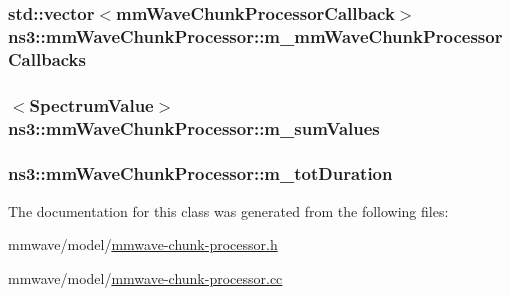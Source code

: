\subsubsection[{\texorpdfstring{m\+\_\+mm\+Wave\+Chunk\+Processor\+Callbacks}{m_mmWaveChunkProcessorCallbacks}}]{\setlength{\rightskip}{0pt plus 5cm}std\+::vector$<${\bf mm\+Wave\+Chunk\+Processor\+Callback}$>$ ns3\+::mm\+Wave\+Chunk\+Processor\+::m\+\_\+mm\+Wave\+Chunk\+Processor\+Callbacks\hspace{0.3cm}{\ttfamily [private]}}\hypertarget{classns3_1_1mmWaveChunkProcessor_a21edc5971d3aad6b36fb74f6802bb144}{}\label{classns3_1_1mmWaveChunkProcessor_a21edc5971d3aad6b36fb74f6802bb144}
\subsubsection[{\texorpdfstring{m\+\_\+sum\+Values}{m_sumValues}}]{$<${\bf Spectrum\+Value}$>$ ns3\+::mm\+Wave\+Chunk\+Processor\+::m\+\_\+sum\+Values\hspace{0.3cm}{\ttfamily [private]}}\hypertarget{classns3_1_1mmWaveChunkProcessor_a1a747955a75920e536fa0106f941fb8b}{}\label{classns3_1_1mmWaveChunkProcessor_a1a747955a75920e536fa0106f941fb8b}
\subsubsection[{\texorpdfstring{m\+\_\+tot\+Duration}{m_totDuration}}]{ ns3\+::mm\+Wave\+Chunk\+Processor\+::m\+\_\+tot\+Duration\hspace{0.3cm}{\ttfamily [private]}}\hypertarget{classns3_1_1mmWaveChunkProcessor_a0b8475d6ba62803eff5db7ae3d23049e}{}\label{classns3_1_1mmWaveChunkProcessor_a0b8475d6ba62803eff5db7ae3d23049e}


The documentation for this class was generated from the following files\+:\begin{DoxyCompactItemize}
\item 
mmwave/model/\hyperlink{mmwave-chunk-processor_8h}{mmwave-\/chunk-\/processor.\+h}\item 
mmwave/model/\hyperlink{mmwave-chunk-processor_8cc}{mmwave-\/chunk-\/processor.\+cc}\end{DoxyCompactItemize}
